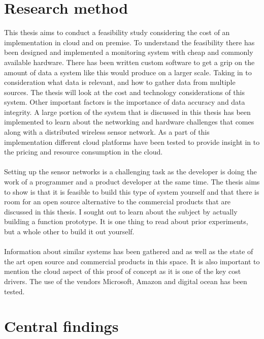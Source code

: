 \documentclass[]{uiophd}
\begin{document}
\section{Research method}
 This thesis aims to conduct a feasibility study considering the cost of an implementation in cloud and on premise. To understand the feasibility there has been designed and implemented a monitoring system with cheap and commonly available hardware. There has been written custom software to get a grip on the amount of data a system like this would produce on a larger scale. Taking in to consideration what data is relevant, and how to gather data from multiple sources. The thesis will look at the cost and technology considerations of this system. Other important factors is the importance of data accuracy and data integrity. A large portion of the system that is discussed in this thesis has been implemented to learn about the networking and hardware challenges that comes along with a distributed wireless sensor network. As a part of this implementation different cloud platforms have been tested to provide insight in to the pricing and resource consumption in the cloud. 
\\\\
Setting up the sensor networks is a challenging task as the developer is doing the work of a programmer and a product developer at the same time. The thesis aims to show is that it is feasible to build this type of system yourself and that there is room for an open source alternative to the commercial products that are discussed in this thesis. I sought out to learn about the subject by actually building a function prototype. It is one thing to read about prior experiments, but a whole other to build it out yourself.
\\\\
Information about similar systems has been gathered and as well as the state of the art open source and commercial products in this space. It is also important to mention the cloud aspect of this proof of concept as it is one of the key cost drivers. The use of the vendors Microsoft, Amazon and digital ocean has been tested.

\section{Central findings}
\end{document}
